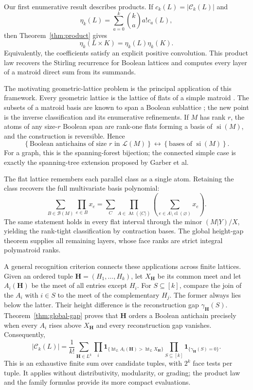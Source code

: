 \documentclass[11pt]{article}
\theoremstyle{definition}
\theoremstyle{remark}
\newcommand{\cl}{\operatorname{cl}}
\newcommand{\lht}{\operatorname{ht}}
\newcommand{\si}{\operatorname{si}}
\newcommand{\cL}{\mathcal L}
\newcommand{\cB}{\mathcal B}
\newcommand{\cC}{\mathcal C}
\begin{document}
Our first enumerative result describes products.  If
$c_k(L)=|\cC_k(L)|$ and
\[
 \eta_k(L)=\sum_{a=0}^k\binom ka a!c_a(L),
\]
then Theorem~\ref{thm:product} gives
\[
 \eta_k(L\times K)=\eta_k(L)\eta_k(K).
\]
Equivalently, the coefficients satisfy an explicit positive convolution.
This product law recovers the Stirling recurrence for Boolean lattices and
computes every layer of a matroid direct sum from its summands.

The motivating geometric-lattice problem is the principal application of
this framework.  Every geometric lattice is the lattice of flats of a simple
matroid \cite{Proudfoot2026}.  The subsets of a matroid basis are known to
span a Boolean sublattice \cite{Speyer2021}; the new point is the inverse
classification and its enumerative refinements.  If $M$ has rank $r$, the
atoms of any size-$r$ Boolean span are rank-one flats forming a basis of
$\si(M)$, and the construction is reversible.  Hence
\[
 \left\{\text{Boolean antichains of size }r\text{ in }\cL(M)\right\}
 \longleftrightarrow
 \left\{\text{bases of }\si(M)\right\}.
\]
For a graph, this is the spanning-forest bijection; the connected simple case
is exactly the spanning-tree extension proposed by Garber et al.

The flat lattice remembers each parallel class as a single atom.  Retaining
the class recovers the full multivariate basis polynomial:
\[
 \sum_{B\in\cB(M)}\prod_{e\in B}x_e
 =\sum_C\prod_{A\in\operatorname{At}(\langle C\rangle)}
       \left(\sum_{e\in A\setminus\cl(\varnothing)}x_e\right).
\]
The same statement holds in every flat interval through the minor
$(M|Y)/X$, yielding the rank-tight classification by contraction bases.  The
global height-gap theorem supplies all remaining layers, whose face ranks are
strict integral polymatroid ranks.

A general recognition criterion connects these applications across finite lattices.  Given an ordered tuple
$\mathbf H=(H_1,\ldots,H_k)$, let $X_{\mathbf H}$ be its common meet and let
$A_i(\mathbf H)$ be the meet of all entries except $H_i$.  For
$S\subseteq[k]$, compare the join of the $A_i$ with $i\in S$ to the meet of
the complementary $H_j$.  The former always lies below the latter.  Their
height difference is the reconstruction gap $\gamma_{\mathbf H}(S)$.
Theorem~\ref{thm:global-gap} proves that $\mathbf H$ orders a Boolean
antichain precisely when every $A_i$ rises above $X_{\mathbf H}$ and every
reconstruction gap vanishes.  Consequently,
\[
 |\cC_k(L)|=\frac1{k!}
 \sum_{\mathbf H\in L^k}
 \prod_i\mathbf 1_{\{\lht_L A_i(\mathbf H)>\lht_L X_{\mathbf H}\}}
 \prod_{S\subseteq[k]}\mathbf 1_{\{\gamma_{\mathbf H}(S)=0\}}.
\]
This is an exhaustive finite sum over candidate tuples, with $2^k$ face tests
per tuple.  It applies without distributivity, modularity, or grading; the
product law and the family formulas provide its more compact evaluations.
\end{document}
